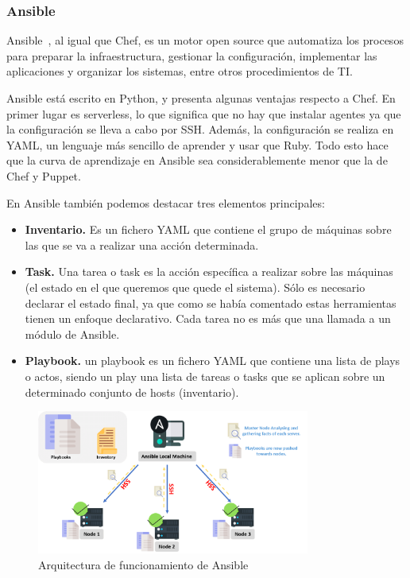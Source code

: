 \subsubsection{Ansible}
	Ansible~\cite{ans1}, al igual que Chef, es un motor open source que automatiza los procesos para preparar la infraestructura, gestionar la configuración, implementar las aplicaciones y organizar los sistemas, entre otros procedimientos de TI.

	Ansible está escrito en Python, y presenta algunas ventajas respecto a Chef. En primer lugar es serverless, lo que significa que no hay que instalar agentes ya que la configuración se lleva a cabo por SSH. Además, la configuración se realiza en YAML, un lenguaje más sencillo de aprender y usar que Ruby. Todo esto hace que la curva de aprendizaje en Ansible sea considerablemente menor que la de Chef y Puppet.

	En Ansible también podemos destacar tres elementos principales:

	\begin{itemize}
		\item \textbf{Inventario.} Es un fichero YAML que contiene el grupo de máquinas sobre las que se va a realizar una acción determinada.
		\item \textbf{Task.} Una tarea o task es la acción específica a realizar sobre las máquinas (el estado en el que queremos que quede el sistema). Sólo es necesario declarar el estado final, ya que como se había comentado estas herramientas tienen un enfoque declarativo. Cada tarea no es más que una llamada a un módulo de Ansible.
		\item \textbf{Playbook.} un playbook es un fichero YAML que contiene una lista de plays o actos, siendo un play una lista de tareas o tasks que se aplican sobre un determinado conjunto de hosts (inventario).
	\end{itemize}
	
	\vspace{0.2cm}
	\begin{figure}[h]
	\centering
	\includegraphics[width=0.8\textwidth]{../imgs/EdA/arquitectura-ansible.png}
	\caption{Arquitectura de funcionamiento de Ansible}
	\label{fig:ansible-arch}
	\end{figure}

